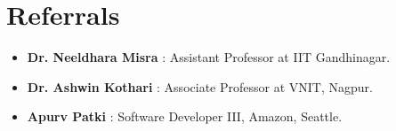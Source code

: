 \documentclass[a4paper,10pt]{extarticle} %
\begin{document}
\section{\textcolor{primary}{Referrals}}
\begin{itemize}[leftmargin=0.55cm, rightmargin=0.2cm, label={\Large\textbullet}]
\item \textbf{Dr. Neeldhara Misra} : Assistant Professor at IIT Gandhinagar.
\vspace{-0.15cm}
\item \textbf{Dr. Ashwin Kothari} : Associate Professor at VNIT, Nagpur.
\vspace{-0.15cm}
\item \textbf{Apurv Patki} : Software Developer III, Amazon, Seattle.
\end{itemize}






\end{document}

